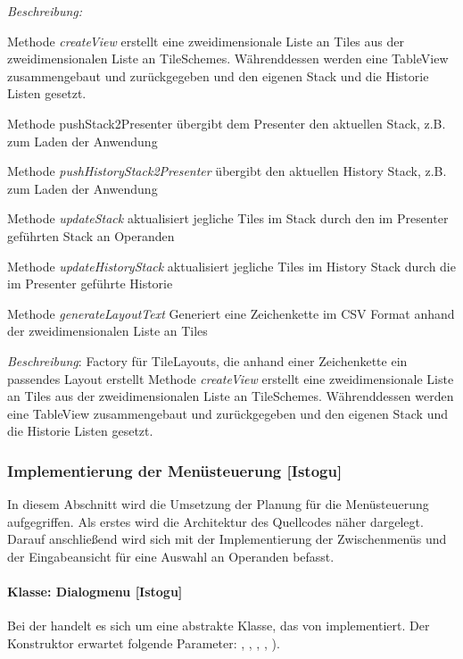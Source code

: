 \textit{Beschreibung: }

Methode \textit{createView} erstellt eine zweidimensionale Liste an Tiles aus der zweidimensionalen Liste an TileSchemes. Währenddessen werden eine TableView zusammengebaut und zurückgegeben und den eigenen Stack und die Historie Listen gesetzt.

Methode pushStack2Presenter übergibt dem Presenter den aktuellen Stack, z.B. zum Laden der Anwendung

Methode \textit{pushHistoryStack2Presenter} übergibt den aktuellen History Stack, z.B. zum Laden der Anwendung

Methode \textit{updateStack} aktualisiert jegliche Tiles im Stack durch den im Presenter geführten Stack an Operanden

Methode \textit{updateHistoryStack} aktualisiert jegliche Tiles im History Stack durch die im Presenter geführte Historie

Methode \textit{generateLayoutText} Generiert eine Zeichenkette im CSV Format anhand der zweidimensionalen Liste an Tiles

\textit{Beschreibung}: Factory für TileLayouts, die anhand einer Zeichenkette ein passendes Layout erstellt
Methode \textit{createView} erstellt eine zweidimensionale Liste an Tiles aus der zweidimensionalen Liste an TileSchemes. Währenddessen werden eine TableView zusammengebaut und zurückgegeben und den eigenen Stack und die Historie Listen gesetzt.


\subsubsection{Implementierung der Menüsteuerung [Istogu]}

In diesem Abschnitt wird die Umsetzung der Planung für die Menüsteuerung aufgegriffen. Als erstes wird die Architektur des Quellcodes näher dargelegt. Darauf anschließend wird sich mit der Implementierung der Zwischenmenüs und der Eingabeansicht für eine Auswahl an Operanden befasst.

\paragraph{Klasse: Dialogmenu [Istogu]}

Bei der  handelt es sich um eine abstrakte Klasse, das von  implementiert. Der Konstruktor erwartet folgende Parameter:  , , , , ).

